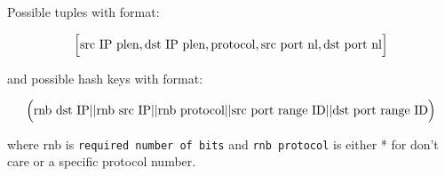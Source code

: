 \documentclass{article}
\begin{document}
    \newpage
    \subsection{}
        Possible tuples with format:
        
        \begin{center}
        \[
        \Bigl[ \text{src IP plen}, \text{dst IP plen}, \text{protocol}, \text{src port nl}, \text{dst port nl} \Bigr]
        \]
        \end{center}    
        

        and possible hash keys with format:

        \begin{center}
        \[
        \Bigl( \text{rnb dst IP} || \text{rnb src IP} || \text{rnb protocol} || \text{src port range ID} || \text{dst port range ID} \Bigr)
        \]
        \end{center}  
        
        where rnb is \glqq\texttt{required number of bits}\grqq{} and \glqq\texttt{rnb protocol}\grqq{} is either * for don't care or a specific protocol number. 
\end{document}
